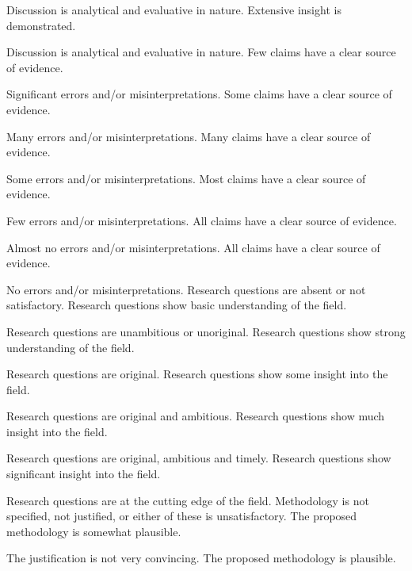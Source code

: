\begin{markingrubric}
        \par		Discussion is analytical and evaluative in nature.
        \grade		Extensive insight is demonstrated.
        \par		Discussion is analytical and evaluative in nature.
        \grade\fail Few claims have a clear source of evidence.
        \par 		Significant errors and/or misinterpretations.
        \grade 		Some claims have a clear source of evidence.
        \par 		Many errors and/or misinterpretations.
        \grade 		Many claims have a clear source of evidence.
        \par 		Some errors and/or misinterpretations.
        \grade 		Most claims have a clear source of evidence.
        \par 		Few errors and/or misinterpretations.
        \grade 		All claims have a clear source of evidence.
        \par 		Almost no errors and/or misinterpretations.
        \grade 		All claims have a clear source of evidence.
        \par 		No errors and/or misinterpretations.
        \grade\fail Research questions are absent or not satisfactory.
        \grade 		Research questions show basic understanding of the field.
        \par		Research questions are unambitious or unoriginal.
        \grade 		Research questions show strong understanding of the field.
        \par		Research questions are original.
        \grade 		Research questions show some insight into the field.
        \par		Research questions are original and ambitious.
        \grade 		Research questions show much insight into the field.
        \par		Research questions are original, ambitious and timely.
        \grade 		Research questions show significant insight into the field.
        \par		Research questions are at the cutting edge of the field.
        \grade\fail Methodology is not specified, not justified, or either of these is unsatisfactory.
        \grade 		The proposed methodology is somewhat plausible.
        \par		The justification is not very convincing.
        \grade 		The proposed methodology is plausible.

\end{markingrubric}
